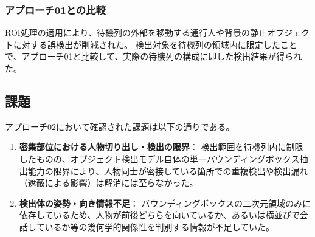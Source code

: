 \subsubsection{アプローチ01との比較}
ROI処理の適用により、待機列の外部を移動する通行人や背景の静止オブジェクトに対する誤検出が削減された。
検出対象を待機列の領域内に限定したことで、アプローチ01と比較して、実際の待機列の構成に即した検出結果が得られた。

\subsection{課題}
アプローチ02において確認された課題は以下の通りである。

\begin{enumerate}
    \item \textbf{密集部位における人物切り出し・検出の限界}：
    検出範囲を待機列内に制限したものの、オブジェクト検出モデル自体の単一バウンディングボックス抽出能力の限界により、人物同士が密接している箇所での重複検出や検出漏れ（遮蔽による影響）は解消には至らなかった。
    \item \textbf{検出体の姿勢・向き情報不足}：
    バウンディングボックスの二次元領域のみに依存しているため、人物が前後どちらを向いているか、あるいは横並びで会話しているか等の幾何学的関係性を判別する情報が不足していた。
\end{enumerate}

\clearpage
